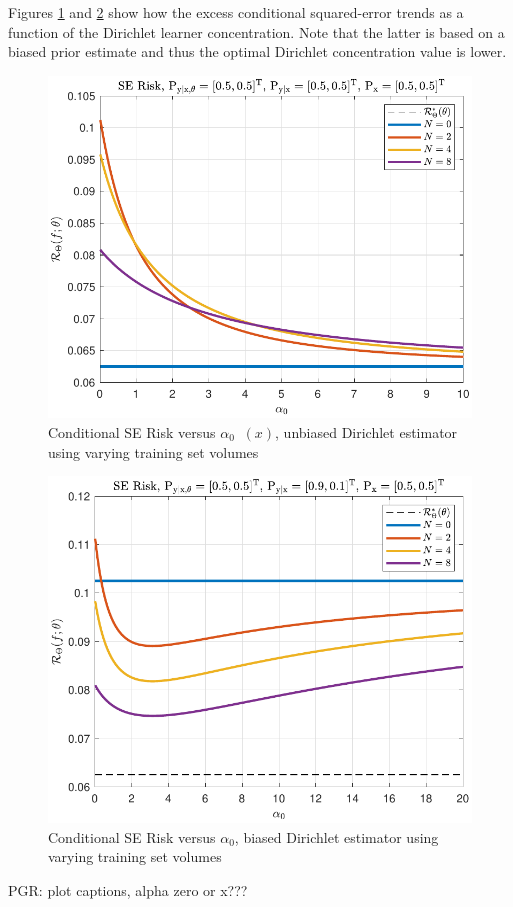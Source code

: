 \documentclass[12pt]{report}
\DeclareMathOperator{\alpham}{\alpha_\text{m}}
\begin{document}
Figures \ref{fig:Risk_cond_SE_Dir_a0_leg_N_unbiased} and \ref{fig:Risk_cond_SE_Dir_a0_leg_N_biased} show how the excess conditional squared-error trends as a function of the Dirichlet learner concentration. Note that the latter is based on a biased prior estimate and thus the optimal Dirichlet concentration value is lower.
\begin{figure}
	\centering
	\includegraphics[width=0.7\linewidth]{Risk_cond_SE_Dir_a0_leg_N_unbiased.pdf}
	\caption{Conditional SE Risk versus $\alpha_0 \alpham(x)$, unbiased Dirichlet estimator using varying training set volumes}
	\label{fig:Risk_cond_SE_Dir_a0_leg_N_unbiased}
\end{figure}
\begin{figure}
	\centering
	\includegraphics[width=0.7\linewidth]{Risk_cond_SE_Dir_a0_leg_N_biased.pdf}
	\caption{Conditional SE Risk versus $\alpha_0$, biased Dirichlet estimator using varying training set volumes}
	\label{fig:Risk_cond_SE_Dir_a0_leg_N_biased}
\end{figure}

PGR: plot captions, alpha zero or x???
\end{document}
